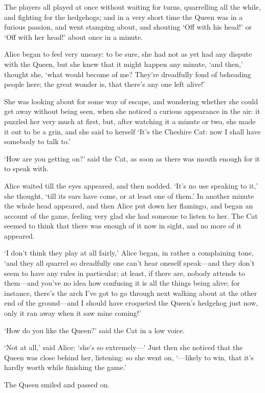 \documentclass[12pt]{book}
\begin{document}
\begin{Parallel}[p]{}{}
{The players all played at once without waiting for turns, quarrelling all the while, and fighting for the hedgehogs; and in a very short time the Queen was in a furious passion, and went stamping about, and shouting ‘Off with his head!’ or ‘Off with her head!’ about once in a minute.

Alice began to feel very uneasy: to be sure, she had not as yet had any dispute with the Queen, but she knew that it might happen any minute, ‘and then,’ thought she, ‘what would become of me? They’re dreadfully fond of beheading people here; the great wonder is, that there’s any one left alive!’

She was looking about for some way of escape, and wondering whether she could get away without being seen, when she noticed a curious appearance in the air: it puzzled her very much at first, but, after watching it a minute or two, she made it out to be a grin, and she said to herself ‘It’s the Cheshire Cat: now I shall have somebody to talk to.’

‘How are you getting on?’ said the Cat, as soon as there was mouth enough for it to speak with.

Alice waited till the eyes appeared, and then nodded. ‘It’s no use speaking to it,’ she thought, ‘till its ears have come, or at least one of them.’ In another minute the whole head appeared, and then Alice put down her flamingo, and began an account of the game, feeling very glad she had someone to listen to her. The Cat seemed to think that there was enough of it now in sight, and no more of it appeared.

‘I don’t think they play at all fairly,’ Alice began, in rather a complaining tone, ‘and they all quarrel so dreadfully one can’t hear oneself speak—and they don’t seem to have any rules in particular; at least, if there are, nobody attends to them—and you’ve no idea how confusing it is all the things being alive; for instance, there’s the arch I’ve got to go through next walking about at the other end of the ground—and I should have croqueted the Queen’s hedgehog just now, only it ran away when it saw mine coming!’

‘How do you like the Queen?’ said the Cat in a low voice.

‘Not at all,’ said Alice: ‘she’s so extremely—’ Just then she noticed that the Queen was close behind her, listening: so she went on, ‘—likely to win, that it’s hardly worth while finishing the game.’

The Queen smiled and passed on.

}
\end{Parallel}
\end{document}
